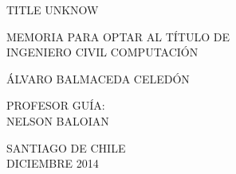 \documentclass[11pt,oneside,letterpaper,leqno]{report}
\newcommand{\memtitle}{TITLE UNKNOW}
\newcommand{\autor}{Álvaro Balmaceda Celedón}
\newcommand{\profesor}{Nelson Baloian}
\newcommand{\fecha}{Diciembre 2014}
\newcommand{\tipomemoria}{INGENIERO CIVIL COMPUTACIÓN}
\newcommand{\Memtitle}{\MakeUppercase{\memtitle}}
\newcommand{\Author}{\MakeUppercase{\autor}}
\newcommand{\Profesor}{\MakeUppercase{\profesor}}
\newcommand{\Fecha}{\MakeUppercase{\fecha}}
\begin{document}
\begin{center}
\vspace{4cm}

\Memtitle

\vspace{2cm}

MEMORIA PARA OPTAR AL TÍTULO DE\\
\tipomemoria

\vspace{2cm}

\Author

\vspace{1cm}
PROFESOR GUÍA:\\
\Profesor \\
\vspace{1cm}

\vfill
SANTIAGO DE CHILE\\
\Fecha
\end{center}
\end{document}
